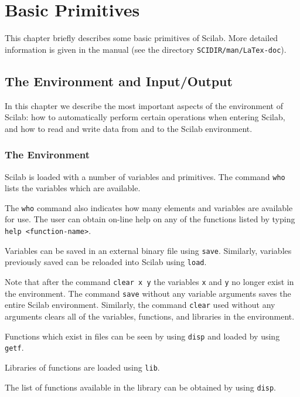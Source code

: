 \chapter{Basic Primitives}
\label{ch5}
This chapter briefly describes some basic primitives of Scilab.
More detailed information is given in the manual 
(see the directory {\tt SCIDIR/man/LaTex-doc}).
\section{The Environment and Input/Output}
	In this chapter we describe the most important aspects
of the environment of Scilab: how to automatically
perform certain operations when entering Scilab,
and how to read and write data
from and to the Scilab environment.

\subsection{The Environment}
\label{s5.1}

 Scilab is loaded with a number of variables and primitives.
The command {\tt who} lists the variables 
which are available.  

The {\tt who} command also indicates how many elements and variables
are available for use.  The user can obtain on-line help on any of 
the functions listed by typing {\tt help <function-name>}.

	Variables can be saved in an external binary
file using {\tt save}.  
Similarly, variables previously saved can be
reloaded into Scilab using {\tt load}.

Note that after the command {\tt clear x y} 
 the variables {\tt x} and
{\tt y} no longer exist in the environment.  
The command {\tt save} without any variable arguments saves the entire 
Scilab environment.  Similarly,
the command {\tt clear} used
without any arguments clears all of the variables, functions, and libraries
in the environment.

	Functions which exist in files can be seen by using {\tt disp}
and loaded by using {\tt getf}.  

Libraries of functions are loaded
using {\tt lib}.  

The list of functions available in the library can be obtained by using {\tt disp}.

